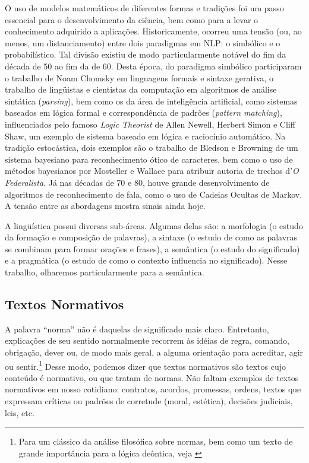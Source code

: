 \documentclass[12pt, a4paper, twoside]{article}
\begin{document}
 O uso de modelos matemáticos de diferentes formas e tradições foi um passo essencial para o desenvolvimento da ciência, bem como para a levar o conhecimento adquirido a aplicações. Historicamente, ocorreu uma tensão (ou, ao menos, um distanciamento) entre dois paradigmas em NLP: o simbólico e o probabilístico. Tal divisão existiu de modo particularmente notável do fim da década de 50 ao fim da de 60. Desta época, do paradigma simbólico participaram o trabalho de Noam Chomsky em linguagens formais e sintaxe gerativa, o trabalho de lingüistas e cientistas da computação em algoritmos de análise sintática (\textit{parsing}), bem como os da área de inteligência artificial, como sistemas baseados em lógica formal e correspondência de padrões (\textit{pattern matching}), influenciados pelo famoso \textit{Logic Theorist} de Allen Newell, Herbert Simon e Cliff Shaw, um exemplo de sistema baseado em lógica e raciocínio automático. Na tradição estocástica, dois exemplos são o trabalho de Bledson e Browning de um sistema bayesiano para reconhecimento ótico de caracteres, bem como o uso de métodos bayesianos por Mosteller e Wallace para atribuir autoria de trechos d'\textit{O Federalista}. Já nas décadas de 70 e 80, houve grande desenvolvimento de algoritmos de reconhecimento de fala, como o uso de Cadeias Ocultas de Markov. \citep[pp.10-11]{Jurafsky:2009} A tensão entre as abordagens mostra sinais ainda hoje. 

A lingüística possui diversas sub-áreas. Algumas delas são:  a morfologia (o estudo da formação e composição de palavras), a sintaxe (o estudo de como as palavras se combinam para formar orações e frases), a semântica (o estudo do significado) e a pragmática (o estudo de como o contexto influencia no significado). Nesse trabalho, olharemos particularmente para a semântica.

\subsection{Textos Normativos}
A palavra ``norma'' não é daquelas de significado mais claro. Entretanto, explicações de seu sentido normalmente recorrem às idéias de regra, comando, obrigação, dever ou, de modo mais geral, a alguma orientação para acreditar, agir ou sentir.\footnote{Para um clássico da análise filosófica sobre normas, bem como um texto de grande importância para a lógica deôntica, veja \citet{Wright:63}} Desse modo, podemos dizer que textos normativos são textos cujo conteúdo é normativo, ou que tratam de normas. Não faltam exemplos de textos normativos em nosso cotidiano: contratos, acordos, promessas, ordens, textos que expressam críticas ou padrões de corretude (moral, estética), decisões judiciais, leis, etc.
\end{document}
